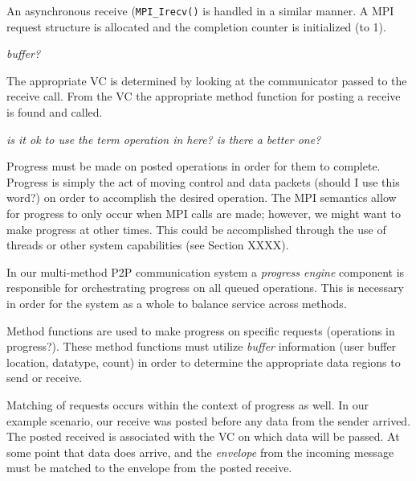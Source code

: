 
An asynchronous receive (\texttt{MPI\_Irecv()} is handled in a similar
manner.  A MPI request structure is allocated and the completion counter is
initialized (to 1).
%

\emph{buffer?}

%
The appropriate VC is determined by looking at the communicator passed to the
receive call.  From the VC the appropriate method function for posting a
receive is found and called.
 
% 

\emph{is it ok to use the term operation in here?  is there a better one?}

Progress must be made on posted operations in order for them to complete.
Progress is simply the act of moving control and data packets (should I use
this word?) on order to accomplish the desired operation.  The MPI semantics
allow for progress to only occur when MPI calls are made; however, we might
want to make progress at other times.  This could be accomplished through the
use of threads or other system capabilities (see Section XXXX).

In our multi-method P2P communication system a \emph{progress engine}
component is responsible for orchestrating progress on all queued operations.  
This is necessary in order for the system as a whole to balance service across
methods.

Method functions are used to make progress on specific requests (operations in
progress?).  These method functions must utilize \emph{buffer} information
(user buffer location, datatype, count) in order to determine the appropriate
data regions to send or receive.

Matching of requests occurs within the context of progress as well.  In our
example scenario, our receive was posted before any data from the sender
arrived.  The posted received is associated with the VC on which data will be
passed.  At some point that data does arrive, and the \emph{envelope} from
the incoming message must be matched to the envelope from the posted receive.

